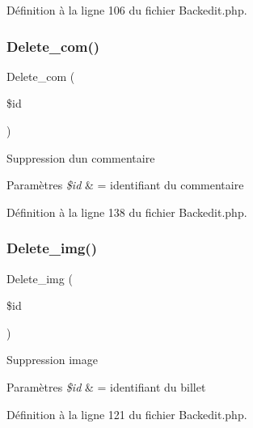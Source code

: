 Définition à la ligne 106 du fichier Backedit.\+php.

\mbox{\label{class_src_1_1_controllers_1_1_backedit_a38147e014898a3417c74b23e903621b0}} 
\subsubsection{\texorpdfstring{Delete\+\_\+com()}{Delete\_com()}}
{\footnotesize\ttfamily Delete\+\_\+com (\begin{DoxyParamCaption}\item[{}]{\$id }\end{DoxyParamCaption})}

Suppression d\textquotesingle{}un commentaire 
\begin{DoxyParams}{Paramètres}
{\em \$id} & = identifiant du commentaire \\
\hline
\end{DoxyParams}


Définition à la ligne 138 du fichier Backedit.\+php.

\mbox{\label{class_src_1_1_controllers_1_1_backedit_a7da0978ffd29442d84e0d4374cb07e8a}} 
\subsubsection{\texorpdfstring{Delete\+\_\+img()}{Delete\_img()}}
{\footnotesize\ttfamily Delete\+\_\+img (\begin{DoxyParamCaption}\item[{}]{\$id }\end{DoxyParamCaption})}

Suppression image 
\begin{DoxyParams}{Paramètres}
{\em \$id} & = identifiant du billet \\
\hline
\end{DoxyParams}


Définition à la ligne 121 du fichier Backedit.\+php.

